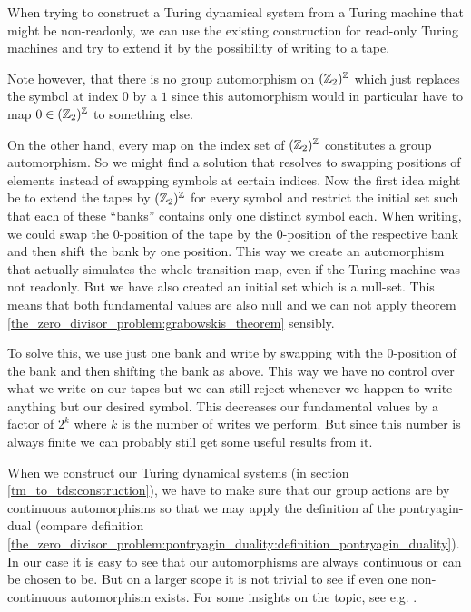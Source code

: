 \begin{Remark}
	When trying to construct a Turing dynamical system from a Turing machine that might be non-readonly, we can use the existing construction for read-only Turing machines and try to extend it by the possibility of writing to a tape.

	Note however, that there is no group automorphism on $(\mathbb{Z}_2)^{\mathbb{Z}}$ which just replaces the symbol at index $0$ by a $1$ since this automorphism would in particular have to map $0 \in (\mathbb{Z}_2)^{\mathbb{Z}}$ to something else.

	On the other hand, every map on the index set of $(\mathbb{Z}_2)^{\mathbb{Z}}$ constitutes a group automorphism. So we might find a solution that resolves to swapping positions of elements instead of swapping symbols at certain indices.
	Now the first idea might be to extend the tapes by $(\mathbb{Z}_2)^{\mathbb{Z}}$ for every symbol and restrict the initial set such that each of these ``banks'' contains only one distinct symbol each.
	When writing, we could swap the $0$-position of the tape by the $0$-position of the respective bank and then shift the bank by one position.
	This way we create an automorphism that actually simulates the whole transition map, even if the Turing machine was not readonly.
	But we have also created an initial set which is a null-set. This means that both fundamental values are also null and we can not apply theorem \ref{the_zero_divisor_problem:grabowskis_theorem} sensibly.

	To solve this, we use just one bank and write by swapping with the $0$-position of the bank and then shifting the bank as above.
	This way we have no control over what we write on our tapes but we can still reject whenever we happen to write anything but our desired symbol. This decreases our fundamental values by a factor of $2^k$ where $k$ is the number of writes we perform. But since this number is always finite we can probably still get some useful results from it.
\end{Remark}

\begin{Remark}
	When we construct our Turing dynamical systems (in section \ref{tm_to_tds:construction}), we have to make sure that our group actions are by continuous automorphisms so that we may apply the definition af the pontryagin-dual (compare definition \ref{the_zero_divisor_problem:pontryagin_duality:definition_pontryagin_duality}).
	In our case it is easy to see that our automorphisms are always continuous or can be chosen to be.
	But on a larger scope it is not trivial to see if even one non-continuous automorphism exists. For some insights on the topic, see e.g. \cite{bhk16}.
\end{Remark}